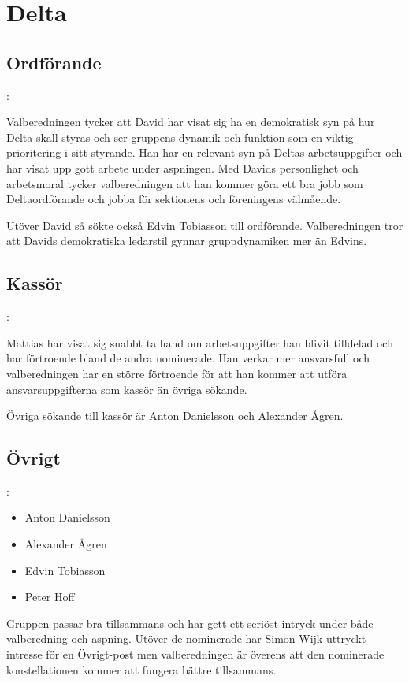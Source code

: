 \section{Delta}
\subsection{Ordförande}
\begin{frame}{\secname: \subsecname}

Valberedningen tycker att David har visat sig ha en demokratisk syn på hur Delta skall styras och ser gruppens dynamik och funktion som en viktig prioritering i sitt styrande. Han har en relevant syn på Deltas arbetsuppgifter och har visat upp gott arbete under aspningen. Med Davids personlighet och arbetsmoral tycker valberedningen att han kommer göra ett bra jobb som Deltaordförande och jobba för sektionens och föreningens välmående.
\bigskip

Utöver David så sökte också Edvin Tobiasson till ordförande. Valberedningen tror att Davids demokratiska ledarstil gynnar gruppdynamiken mer än Edvins.
\end{frame}

\subsection{Kassör}
\begin{frame}{\secname: \subsecname}

Mattias har visat sig snabbt ta hand om arbetsuppgifter han blivit tilldelad och har förtroende bland de andra nominerade. Han verkar mer ansvarsfull och valberedningen har en större förtroende för att han kommer att utföra ansvarsuppgifterna som kassör än övriga sökande.

\bigskip
Övriga sökande till kassör är Anton Danielsson och Alexander Ågren.
\end{frame}

\subsection{Övrigt}
\begin{frame}{\secname: \subsecname}
\begin{itemize}
\item Anton Danielsson
\item Alexander Ågren
\item Edvin Tobiasson
\item Peter Hoff
\end{itemize}
\bigskip
Gruppen passar bra tillsammans och har gett ett seriöst intryck under både valberedning och aspning.  Utöver de nominerade har Simon Wijk uttryckt intresse för en Övrigt-post men valberedningen är överens att den nominerade konstellationen kommer att fungera bättre tillsammans.
\end{frame}